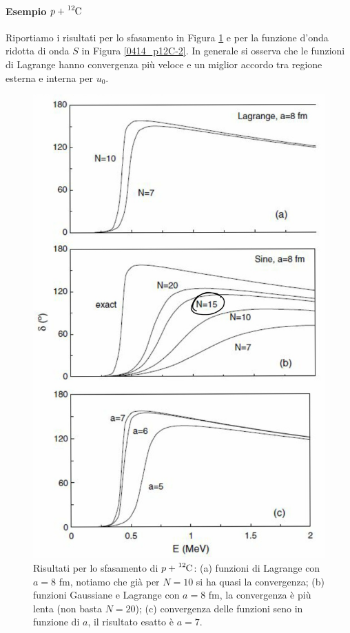 \paragraph{Esempio ${p+\ce{^{12}C}}$} Riportiamo i risultati per lo sfasamento in Figura \ref{0414_p12C} e per la funzione d'onda ridotta di onda $S$ in Figura \ref{0414_p12C-2}. In generale si osserva che le funzioni di Lagrange hanno convergenza più veloce e un miglior accordo tra regione esterna e interna per $u_0$.
\begin{figure}[h]
	\centering
	\includegraphics[scale=0.2]{Immagini/0414_metodi.png}
	\caption{Risultati per lo sfasamento di $p+\ce{^{12}C}$: (a) funzioni di Lagrange con $a=8$ fm, notiamo che già per $N=10$ si ha quasi la convergenza; (b) funzioni Gaussiane e Lagrange con $a=8$ fm, la convergenza è più lenta (non basta $N=20$); (c) convergenza delle funzioni seno in funzione di $a$, il risultato esatto è $a=7$.}
	\label{0414_p12C}
\end{figure}
